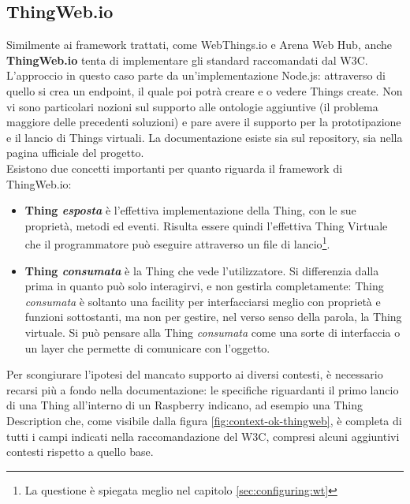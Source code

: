 \documentclass[12pt,a4paper,openright,oneside]{report}
\begin{document}
\subsection{ThingWeb.io}
Similmente ai framework trattati, come WebThings.io e Arena Web Hub, anche \textbf{ThingWeb.io} \cite{thingweb} tenta di implementare gli standard raccomandati dal W3C. L'approccio in questo caso parte da un'implementazione Node.js: attraverso di quello si crea un endpoint, il quale poi potrà creare e o vedere Things create. Non vi sono particolari nozioni sul supporto alle ontologie aggiuntive (il problema maggiore delle precedenti soluzioni) e pare avere il supporto per la prototipazione e il lancio di Things virtuali. La documentazione esiste sia sul repository, sia nella pagina ufficiale del progetto.\\

Esistono due concetti importanti per quanto riguarda il framework di ThingWeb.io:
\begin{itemize}
	\item \textbf{Thing \textit{esposta}} è l'effettiva implementazione della Thing, con le sue proprietà, metodi ed eventi. Risulta essere quindi l'effettiva Thing Virtuale che il programmatore può eseguire attraverso un file di lancio\footnote{La questione è spiegata meglio nel capitolo \ref{sec:configuring:wt}}.
	
	\item \textbf{Thing \textit{consumata}} è la Thing che vede l'utilizzatore. Si differenzia dalla prima in quanto può solo interagirvi, e non gestirla completamente: Thing \textit{consumata} è soltanto una facility per interfacciarsi meglio con proprietà e funzioni sottostanti, ma non per gestire, nel verso senso della parola, la Thing virtuale. Si può pensare alla Thing \textit{consumata} come una sorte di interfaccia o un layer che permette di comunicare con l'oggetto.
\end{itemize}

Per scongiurare l'ipotesi del mancato supporto ai diversi contesti, è necessario recarsi più a fondo nella documentazione: le specifiche riguardanti il primo lancio di una Thing all'interno di un Raspberry indicano, ad esempio una Thing Description che, come visibile dalla figura \ref{fig:context-ok-thingweb}, è completa di tutti i campi indicati nella raccomandazione del W3C, compresi alcuni aggiuntivi contesti rispetto a quello base.\\
\end{document}
